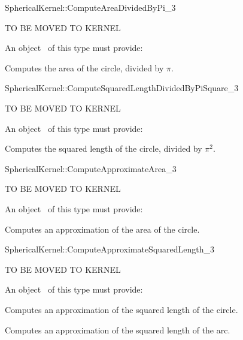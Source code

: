\begin{ccRefFunctionObjectConcept}{SphericalKernel::ComputeAreaDividedByPi_3}

TO BE MOVED TO KERNEL

An object \ccVar\ of this type must provide:

{Computes the area of the circle, divided by $\pi$.}

\ccSeeAlso


\end{ccRefFunctionObjectConcept}
\begin{ccRefFunctionObjectConcept}{SphericalKernel::ComputeSquaredLengthDividedByPiSquare_3}

TO BE MOVED TO KERNEL

An object \ccVar\ of this type must provide:

{Computes the squared length of the circle, divided by $\pi^2$.}

\ccSeeAlso


\end{ccRefFunctionObjectConcept}
\begin{ccRefFunctionObjectConcept}{SphericalKernel::ComputeApproximateArea_3}

TO BE MOVED TO KERNEL

An object \ccVar\ of this type must provide:

{Computes an approximation of the area of the circle.}

\ccSeeAlso


\end{ccRefFunctionObjectConcept}
\begin{ccRefFunctionObjectConcept}{SphericalKernel::ComputeApproximateSquaredLength_3}

TO BE MOVED TO KERNEL

An object \ccVar\ of this type must provide:

{Computes an approximation of the squared length of the circle.}

{Computes an approximation of the squared length of the arc.}

\ccSeeAlso


\end{ccRefFunctionObjectConcept}

